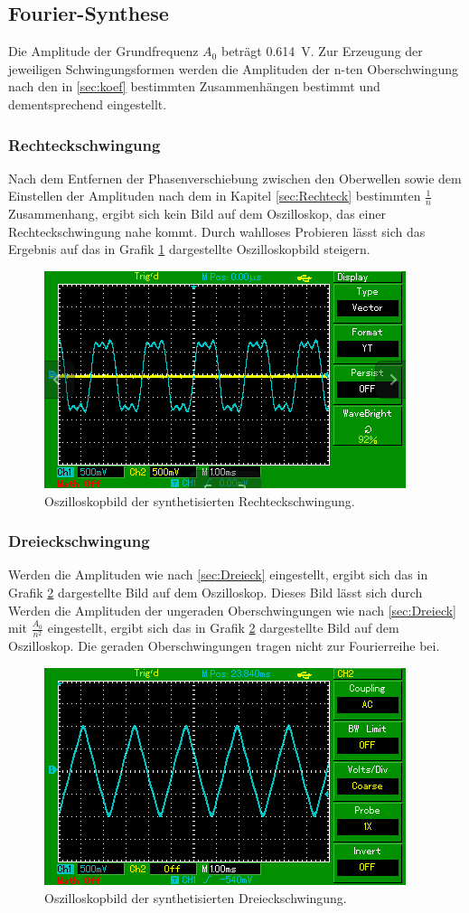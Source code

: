 \subsection{Fourier-Synthese}
Die Amplitude der Grundfrequenz $A_0$ beträgt \SI{0.614}{\volt}. Zur Erzeugung der jeweiligen
Schwingungsformen werden die Amplituden der n-ten Oberschwingung nach den in \ref{sec:koef}
bestimmten Zusammenhängen bestimmt und dementsprechend eingestellt.
\subsubsection{Rechteckschwingung}
Nach dem Entfernen der Phasenverschiebung zwischen den Oberwellen sowie dem Einstellen
der Amplituden nach dem in Kapitel \ref{sec:Rechteck} bestimmten $\frac{1}{n}$ Zusammenhang,
ergibt sich kein Bild auf dem Oszilloskop, das einer Rechteckschwingung nahe kommt.
Durch wahlloses Probieren lässt sich das Ergebnis auf das in Grafik \ref{abb:1} dargestellte
Oszilloskopbild steigern.
\begin{figure}
  \centering
  \includegraphics[scale=0.4]{Rechteck.png}
  \caption{Oszilloskopbild der synthetisierten Rechteckschwingung.}
  \label{abb:1}
\end{figure}
\subsubsection{Dreieckschwingung}
Werden die Amplituden wie nach \ref{sec:Dreieck} eingestellt, ergibt sich das in
Grafik \ref{abb:2} dargestellte Bild auf dem Oszilloskop. Dieses Bild lässt sich durch
Werden die Amplituden  der ungeraden Oberschwingungen wie nach \ref{sec:Dreieck} mit $\frac{A_0}{n^2}$ eingestellt,
ergibt sich das in Grafik \ref{abb:2} dargestellte Bild auf dem Oszilloskop. Die geraden Oberschwingungen tragen nicht
zur Fourierreihe bei.
\begin{figure}
  \centering
  \includegraphics[scale=0.4]{Dreieck.png}
  \caption{Oszilloskopbild der synthetisierten Dreieckschwingung.}
  \label{abb:2}
\end{figure}
